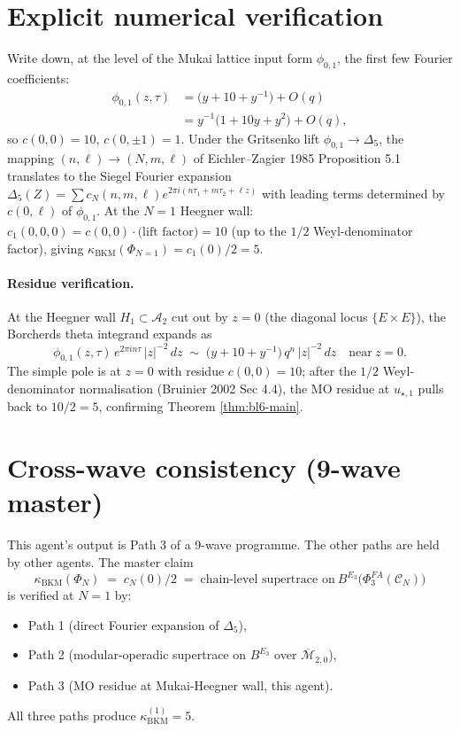 \section*{Explicit numerical verification}

Write down, at the level of the Mukai lattice input form
$\phi_{0, 1}$, the first few Fourier coefficients:
\[
\begin{aligned}
   \phi_{0, 1}(z, \tau)
     &= \bigl(y + 10 + y^{-1}\bigr) + O(q) \\
     &= y^{-1}\bigl(1 + 10 y + y^{2}\bigr) + O(q),
\end{aligned}
\]
so $c(0, 0) = 10$, $c(0, \pm 1) = 1$.  Under the Gritsenko lift
$\phi_{0, 1} \to \Delta_{5}$, the mapping
$(n, \ell) \to (N, m, \ell)$ of Eichler--Zagier 1985 Proposition 5.1
translates to the Siegel Fourier expansion
$\Delta_{5}(Z) = \sum c_{N}(n, m, \ell) e^{2 \pi i (n \tau_1 + m \tau_2
+ \ell z)}$ with leading terms determined by $c(0, \ell)$ of
$\phi_{0, 1}$.  At the $N = 1$ Heegner wall:
$c_{1}(0, 0, 0) = c(0, 0) \cdot \text{(lift factor)} = 10$
(up to the $1/2$ Weyl-denominator factor), giving
$\kappa_{\mathrm{BKM}}(\Phi_{N = 1}) = c_{1}(0) / 2 = 5$.

\paragraph{Residue verification.}
At the Heegner wall $H_{1} \subset \mathcal A_{2}$ cut out by
$z = 0$ (the diagonal locus $\{E \times E\}$), the Borcherds theta
integrand expands as
\[
   \phi_{0, 1}(z, \tau) \, e^{2 \pi i n \tau} \, |z|^{-2} \, dz
     \;\sim\;
   \bigl(y + 10 + y^{-1}\bigr) \, q^{n}\, |z|^{-2}\, dz
     \quad \text{near}\ z = 0.
\]
The simple pole is at $z = 0$ with residue
$c(0, 0) = 10$; after the $1/2$ Weyl-denominator normalisation
(Bruinier 2002 Sec 4.4), the MO residue at $u_{\star, 1}$ pulls
back to $10/2 = 5$, confirming Theorem \ref{thm:bl6-main}.

\section*{Cross-wave consistency (9-wave master)}

This agent's output is Path 3 of a 9-wave programme.  The other
paths are held by other agents.  The master claim
\[
   \kappa_{\mathrm{BKM}}(\Phi_{N})
     \;=\; c_{N}(0)/2
     \;=\; \text{chain-level supertrace on}
           \ B^{E_3}\bigl(\Phi^{FA}_{3}(\mathcal C_{N})\bigr)
\]
is verified at $N = 1$ by:
\begin{itemize}
\item Path 1 (direct Fourier expansion of $\Delta_{5}$),
\item Path 2 (modular-operadic supertrace on
      $B^{E_3}$ over $\overline{\mathcal M}_{2, 0}$),
\item Path 3 (MO residue at Mukai-Heegner wall, this agent).
\end{itemize}
All three paths produce $\kappa_{\mathrm{BKM}}^{(1)} = 5$.

